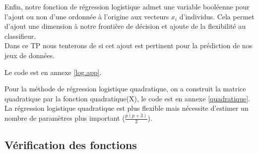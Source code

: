 \documentclass{article}
\begin{document}
Enfin, notre fonction de régression logistique admet une variable booléenne pour l'ajout ou non d'une ordonnée à l'origine aux vecteurs $x_i$ d'individus. Cela permet d'ajout une dimension à notre frontière de décision et ajoute de la flexibilité au classifieur.\\
Dans ce TP nous tenterons de si cet ajout est pertinent pour la prédiction de nos jeux de données.



Le code est en annexe \ref{log.app}.

Pour la méthode de régression logistique quadratique, on a construit la matrice quadratique par la fonction quadratique(X), le code est en annexe \ref{quadratique}. La régression logistique quadratique est plus flexible mais nécessite d'estimer un nombre de paramètres plus important ($\frac{p(p+3)}{2}$).


\subsection{Vérification des fonctions}
\end{document}
